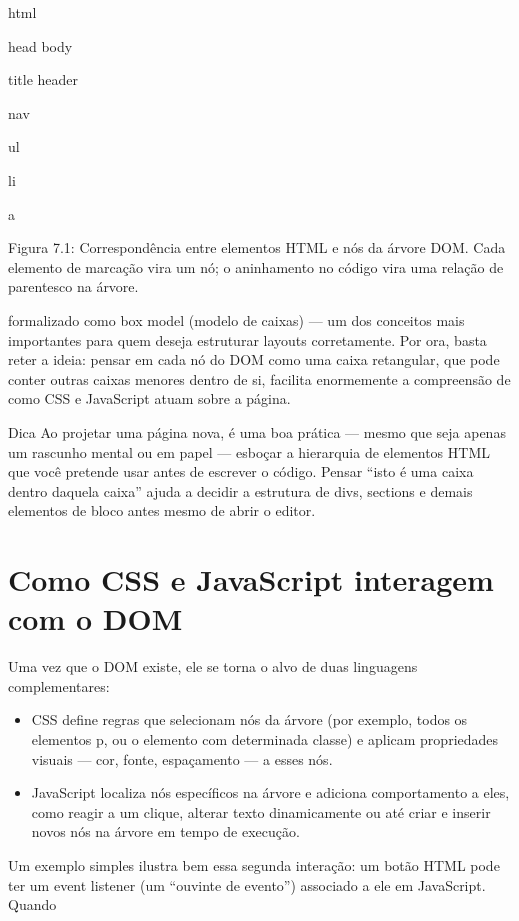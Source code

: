 html

head body

title header

nav

ul

li

a

Figura 7.1: Correspondência entre elementos HTML e nós da árvore DOM. Cada elemento de marcação vira um nó; o aninhamento no código vira uma relação de parentesco na árvore.

formalizado como box model (modelo de caixas) — um dos conceitos mais importantes para quem deseja estruturar layouts corretamente. Por ora, basta reter a ideia: pensar em cada nó do DOM como uma caixa retangular, que pode conter outras caixas menores dentro de si, facilita enormemente a compreensão de como CSS e JavaScript atuam sobre a página.

\begin{infobox}{Dica}
Ao projetar uma página nova, é uma boa prática — mesmo que seja apenas um rascunho mental ou em papel — esboçar a hierarquia de elementos HTML que você pretende usar antes de escrever o código. Pensar “isto é uma caixa dentro daquela caixa” ajuda a decidir a estrutura de divs, sections e demais elementos de bloco antes mesmo de abrir o editor.
\end{infobox}

\section{Como CSS e JavaScript interagem com o DOM}

Uma vez que o DOM existe, ele se torna o alvo de duas linguagens complementares:

\begin{itemize}
  \item CSS define regras que selecionam nós da árvore (por exemplo, todos os elementos p, ou o elemento com determinada classe) e aplicam propriedades visuais — cor, fonte, espaçamento — a esses nós.
\end{itemize}

\begin{itemize}
  \item JavaScript localiza nós específicos na árvore e adiciona comportamento a eles, como reagir a um clique, alterar texto dinamicamente ou até criar e inserir novos nós na árvore em tempo de execução.
\end{itemize}

Um exemplo simples ilustra bem essa segunda interação: um botão HTML pode ter um event listener (um “ouvinte de evento”) associado a ele em JavaScript. Quando

